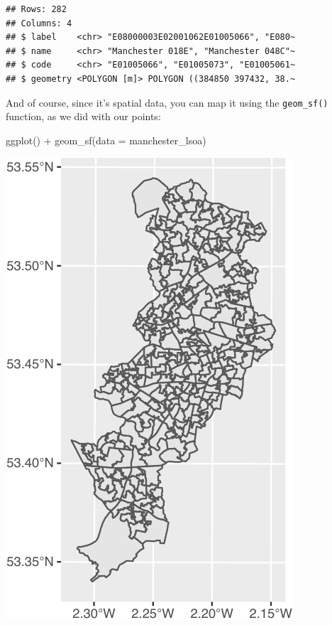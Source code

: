 \documentclass[
  krantz2]{krantz}
\makeatletter
\newenvironment{Shaded}{\begin{snugshade}}{\end{snugshade}}
\newcommand{\AttributeTok}[1]{\textcolor[rgb]{0.61,0.61,0.61}{#1}}
\newcommand{\FunctionTok}[1]{\textcolor[rgb]{0,0,0}{#1}}
\newcommand{\NormalTok}[1]{#1}
\newcommand{\SpecialCharTok}[1]{\textcolor[rgb]{0,0,0}{#1}}
\newenvironment{kframe}{%
\medskip{}
\setlength{\fboxsep}{.8em}
 \def\at@end@of@kframe{}%
 \ifinner\ifhmode%
  \def\at@end@of@kframe{\end{minipage}}%
  \begin{minipage}{\columnwidth}%
 \fi\fi%
 \def\FrameCommand##1{\hskip\@totalleftmargin \hskip-\fboxsep
 \colorbox{shadecolor}{##1}\hskip-\fboxsep
     \hskip-\linewidth \hskip-\@totalleftmargin \hskip\columnwidth}%
 \MakeFramed {\advance\hsize-\width
   \@totalleftmargin\z@ \linewidth\hsize
   \@setminipage}}%
 {\par\unskip\endMakeFramed%
 \at@end@of@kframe}
\renewenvironment{Shaded}{\begin{kframe}}{\end{kframe}}
\makeatother
\begin{document}
\begin{verbatim}
## Rows: 282
## Columns: 4
## $ label    <chr> "E08000003E02001062E01005066", "E080~
## $ name     <chr> "Manchester 018E", "Manchester 048C"~
## $ code     <chr> "E01005066", "E01005073", "E01005061~
## $ geometry <POLYGON [m]> POLYGON ((384850 397432, 38.~
\end{verbatim}

And of course, since it's spatial data, you can map it using the \texttt{geom\_sf()} function, as we did with our points:

\begin{Shaded}
\begin{Highlighting}[]
\FunctionTok{ggplot}\NormalTok{() }\SpecialCharTok{+} 
  \FunctionTok{geom\_sf}\NormalTok{(}\AttributeTok{data =}\NormalTok{ manchester\_lsoa)}
\end{Highlighting}
\end{Shaded}

\includegraphics{crime_mapping_files/figure-latex/unnamed-chunk-21-1.pdf}
\end{document}
